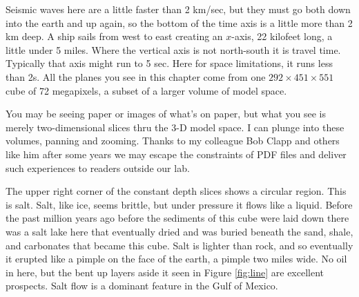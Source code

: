 
\par
Seismic waves here are a little faster than 2 km/sec,
but they must go both down into the earth and up again,
so the bottom of the time axis is a little more than 2 km deep.
A ship sails from west to east creating an $x$-axis,
22 kilofeet long, a little under 5 miles.
Where the vertical axis is not north-south it is travel time.
Typically that axis might run to 5 sec.
Here for space limitations, it runs less than 2s.
All the planes you see in this chapter come from one
$292\times 451\times 551 $ cube of 72 megapixels,
a subset of a larger volume of model space.

\par
{}

\par
You may be seeing paper or images of what's on paper,
but what you see is merely two-dimensional slices thru the 3-D model space.
I can plunge into these volumes, panning and zooming.
Thanks to my colleague Bob Clapp and others like him
after some years we may escape the constraints of PDF files
and deliver such experiences to readers outside our lab.

The upper right corner of the constant depth slices shows a circular region.
This is salt.  Salt, like ice, seems brittle, but under pressure it flows like a liquid.
Before the past million years ago before the sediments
of this cube were laid down
there was a salt lake here
that eventually dried and was buried beneath the sand, shale,
and carbonates that became this cube.
Salt is lighter than rock,
and so eventually it erupted like a pimple on the face of the earth,
a pimple two miles wide.
No oil in here, but the bent up layers aside it seen
in Figure \ref{fig:line} are excellent prospects.
Salt flow is a dominant feature in the Gulf of Mexico.

